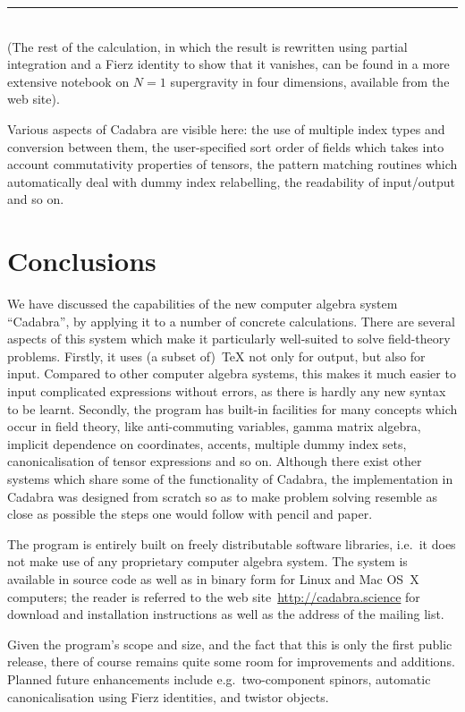 \documentclass[11pt]{article}
\newcommand{\botrule}{\noindent\hspace{25pt}\rule{435pt}{.1pt}\\[2ex]}
\newcommand{\Cdb}{{Cadabra}\xspace}
\begin{document}
\botrule 
(The rest of the calculation, in which the result is rewritten using
partial integration and a Fierz identity to show that it vanishes, can
be found in a more extensive notebook on $N=1$ supergravity in four
dimensions, available from the web site).

Various aspects of \Cdb are visible here: the use of multiple
index types and conversion between them, the user-specified sort order
of fields which takes into account commutativity properties of
tensors, the pattern matching routines which automatically deal with dummy
index relabelling, the readability of input/output and so on. 


\section{Conclusions}

We have discussed the capabilities of the new computer algebra system
``\Cdb'', by applying it to a number of concrete calculations. There are
several aspects of this system which make it particularly well-suited
to solve field-theory problems. Firstly, it uses (a subset of)~\TeX{}
not only for output, but also for input. Compared to other computer
algebra systems, this makes it much easier to input complicated
expressions without errors, as there is hardly any new syntax to be
learnt. Secondly, the program has built-in facilities for many
concepts which occur in field theory, like anti-commuting variables,
gamma matrix algebra, implicit dependence on coordinates, accents,
multiple dummy index sets, canonicalisation of tensor expressions and
so on. Although there exist other systems which share some of the
functionality of \Cdb, the implementation in \Cdb was designed from
scratch so as to make problem solving resemble as close as possible
the steps one would follow with pencil and paper.

The program is entirely built on freely distributable software
libraries, i.e.~it does not make use of any proprietary computer
algebra system.  The system is available in source code as well as in
binary form for Linux and Mac OS~X computers; the reader is referred
to the web site~\url{http://cadabra.science} for download and
installation instructions as well as the address of the mailing list.

Given the program's scope and size, and the fact that this is only the
first public release, there of course remains quite some room for
improvements and additions. Planned future enhancements include
e.g.~two-component spinors, automatic canonicalisation using
Fierz identities, and twistor objects. 
\end{document}
